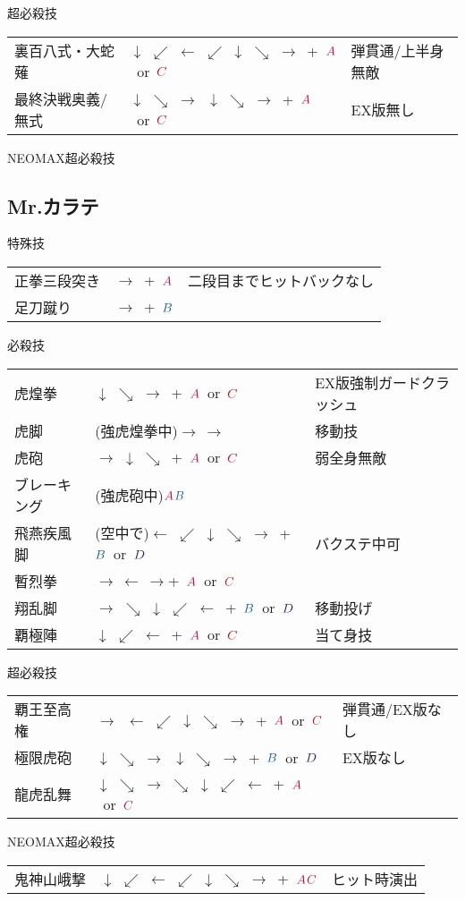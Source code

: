 \documentclass[a4j,11pt]{jarticle}
\def\A{$\textcolor{Acolor}{A}$}
\def\C{$\textcolor{Ccolor}{C}$}
\def\B{$\textcolor{Bcolor}{B}$}
\def\D{$\textcolor{Dcolor}{D}$}
\def\zanretu{$\rightarrow\ \leftarrow\ \rightarrow$}
\def\hado{$\downarrow$ $\searrow$ $\rightarrow$}%
\def\tatsu{$\downarrow$ $\swarrow$ $\leftarrow$}%
\def\syoryu{$\rightarrow$ $\downarrow$ $\searrow$}%
\def\yoga{$\leftarrow$ $\swarrow$ $\downarrow$ $\searrow$ $\rightarrow$}%
\def\gyakuyoga{$\rightarrow$ $\searrow$ $\downarrow$ $\swarrow$ $\leftarrow$}%
\def\ryuko{$\downarrow$ $\searrow$ $\rightarrow$ $\searrow$ $\downarrow$ $\swarrow$ $\leftarrow$}%
\def\orochi{$\downarrow$ $\swarrow$ $\leftarrow$ $\swarrow$ $\downarrow$ $\searrow$ $\rightarrow$}%
\begin{document}
\begin{itembox}[l]{超必殺技}
\begin{tabular}{lll}
裏百八式・大蛇薙&\orochi\ +\ \A\ or\ \C&弾貫通/上半身無敵\\%
最終決戦奥義/無式&\hado\ \hado\ +\ \A\ or\ \C&EX版無し%
\end{tabular}
\end{itembox}
\begin{itembox}[l]{NEOMAX超必殺技}
\end{itembox}
\newpage
\subsection{Mr.カラテ}
\begin{itembox}[l]{特殊技}
\begin{tabular}{lll}
正拳三段突き&$\rightarrow$\ +\ \A&二段目までヒットバックなし\\%
足刀蹴り&$\rightarrow$\ +\ \B&%
\end{tabular}
\end{itembox}
\begin{itembox}[l]{必殺技}
\begin{tabular}{lll}
虎煌拳&\hado\ +\ \A\ or\ \C&EX版強制ガードクラッシュ\\%
虎脚&(強虎煌拳中)$\rightarrow\ \rightarrow$&移動技\\%
虎砲&\syoryu\ +\ \A\ or\ \C&弱全身無敵\\%
ブレーキング&(強虎砲中)\A\B&\\%
飛燕疾風脚&(空中で)\yoga\ +\ \B\ or\ \D&バクステ中可\\%
暫烈拳&\zanretu +\ \A\ or\ \C&\\%
翔乱脚&\gyakuyoga\ +\ \B\ or\ \D&移動投げ\\%
覇極陣&\tatsu\ +\ \A\ or\ \C&当て身技%
\end{tabular}
\end{itembox}
\begin{itembox}[l]{超必殺技}
\begin{tabular}{lll}
覇王至高権&$\rightarrow$\ \yoga\ +\ \A\ or\ \C&弾貫通/EX版なし\\%
極限虎砲&\hado\ \hado\ +\ \B\ or\ \D&EX版なし\\%
龍虎乱舞&\ryuko\ +\ \A\ or\ \C&%
\end{tabular}
\end{itembox}
\begin{itembox}[l]{NEOMAX超必殺技}
\begin{tabular}{lll}
鬼神山峨撃&\orochi\ +\ \A\C&ヒット時演出%
\end{tabular}
\end{itembox}
\newpage
\end{document}
